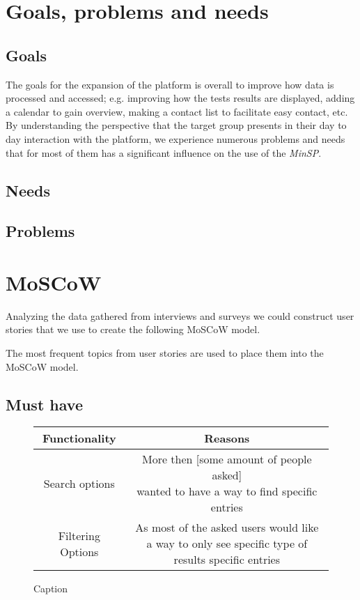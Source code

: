 \documentclass[a4paper,11pt]{article}
\begin{document}
\section{Goals, problems and needs}

\subsection{Goals}
The goals for the expansion of the platform is overall to improve how data is processed and accessed; e.g. improving how the tests results are displayed, adding a calendar to gain overview, making a contact list to facilitate easy contact, etc.
By understanding the perspective that the target group presents in their day to day interaction with the platform, we experience numerous problems and needs that for most of them has a significant influence on the use of the \textit{MinSP}. 

\subsection{Needs}

\subsection{Problems}

\section{MoSCoW}
Analyzing the data gathered from interviews and surveys we could construct user stories that we use to create the following MoSCoW model.

The most frequent topics from user stories are used to place them into the MoSCoW model.

\subsection{Must have}
\begin{figure}[H]{\textwidth}
    \centering
    \begin{tabular}{|c|c|}
    \hline
     \textbf{Functionality} & \textbf{Reasons} \\\hline
     Search options &\makecell{More then [some amount of people asked]\\ wanted to have a way to find specific entries}  \\\hline
     Filtering Options & \makecell{As most of the asked users would like \\a way to only see specific type of results specific entries } \\\hline
\end{tabular}{}
    \caption{Caption}
    \label{fig:my_label}
\end{figure}{}
\end{document}
